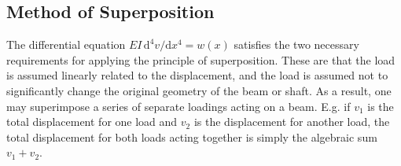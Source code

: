 
\subsection{Method of Superposition}
The differential equation $EI \, \mathrm{d}^{4} v / \mathrm{d} x^{4} = w(x)$ satisfies the two necessary requirements for applying the principle of superposition.
These are that the load is assumed linearly related to the displacement, and the load is assumed not to significantly change the original geometry of the beam or shaft.
As a result, one may superimpose a series of separate loadings acting on a beam.
E.g. if $v_1$ is the total displacement for one load and $v_2$ is the displacement for another load, the total displacement for both loads acting together is simply the algebraic sum $v_1 + v_2$.


